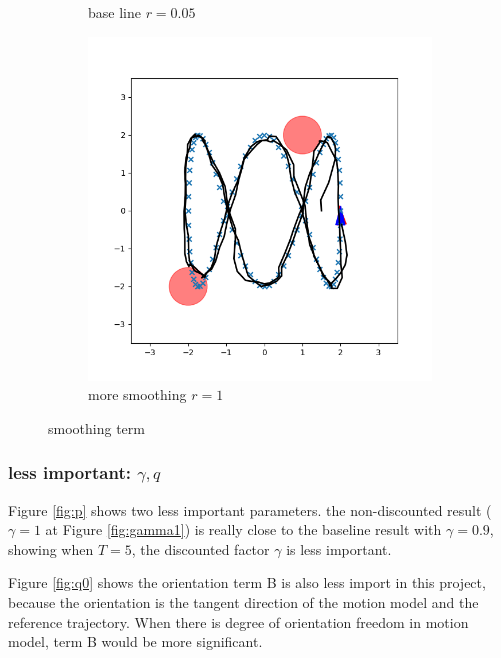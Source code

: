 \documentclass[conference]{IEEEtran}
\begin{document}
\begin{figure}[h]
\begin{subfigure}[b]{0.3\textwidth}
        \caption{base line $r=0.05$}
        \label{fig:r005}
    \end{subfigure}
    \hfill
    \begin{subfigure}[b]{0.3\textwidth}
        \includegraphics[width=\textwidth]{../fig/trajectory.cec.r_1.png}
        \caption{more smoothing $r=1$}
        \label{fig:r1}
    \end{subfigure}
    \caption{smoothing term}
    \label{fig:r}
\end{figure}

\subsubsection{less important: $\gamma, q$}
Figure \ref{fig:p} shows two less important parameters.
the non-discounted result ($\gamma = 1$ at Figure \ref{fig:gamma1}) is really close to the baseline result with $\gamma = 0.9$,
showing when $T=5$, the discounted factor $\gamma$ is less important.

Figure \ref{fig:q0} shows the orientation term B is also less import in this project,
because the orientation is the tangent direction of the motion model and the reference trajectory.
When there is degree of orientation freedom in motion model, term B would be more significant.
\end{document}

